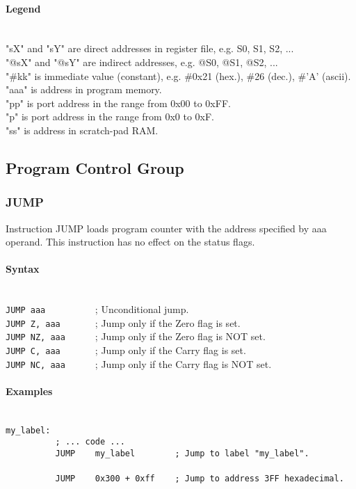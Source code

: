 
    \paragraph{Legend}
        ~\\
        "sX" and "sY" are direct addresses in register file, e.g. S0, S1, S2, ...\\
        "@sX" and "@sY" are indirect addresses, e.g. @S0, @S1, @S2, ...\\
        "\#kk" is immediate value (constant), e.g. \#0x21 (hex.), \#26 (dec.), \#'A' (ascii).\\
        "aaa" is address in program memory.\\
        "pp" is port address in the range from 0x00 to 0xFF.\\
        "p" is port address in the range from 0x0 to 0xF.\\
        "ss" is address in scratch-pad RAM.

    \subsection{Program Control Group}
        \subsubsection{JUMP}
            Instruction JUMP loads program counter with the address specified by aaa operand. This instruction has no effect on the status flags.

            \paragraph{Syntax}
                ~\\
                \verb'JUMP aaa          '; Unconditional jump.\\
                \verb'JUMP Z, aaa       '; Jump only if the Zero flag is set.\\
                \verb'JUMP NZ, aaa      '; Jump only if the Zero flag is NOT set.\\
                \verb'JUMP C, aaa       '; Jump only if the Carry flag is set.\\
                \verb'JUMP NC, aaa      '; Jump only if the Carry flag is NOT set.

            \paragraph{Examples}
                ~\\
                \verb'my_label:'\\
                \verb'          ; ... code ...'\\
                \verb'          JUMP    my_label        ; Jump to label "my_label".'\\
                \verb''\\
                \verb'          JUMP    0x300 + 0xff    ; Jump to address 3FF hexadecimal.'

